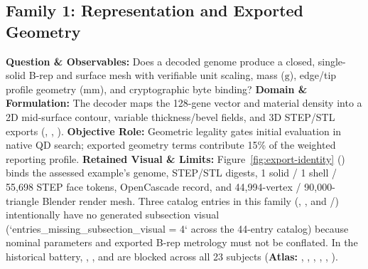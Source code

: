 \subsection{Family 1: Representation and Exported Geometry}
\label{subsec:family-geometry}
\textbf{Question \& Observables:} Does a decoded genome produce a closed, single-solid B-rep and surface mesh with verifiable unit scaling, mass ($\mathrm{g}$), edge/tip profile geometry ($\mathrm{mm}$), and cryptographic byte binding?
\textbf{Domain \& Formulation:} The decoder maps the 128-gene vector and material density into a 2D mid-surface contour, variable thickness/bevel fields, and 3D STEP/STL exports (, , ).
\textbf{Objective Role:} Geometric legality gates initial evaluation in native QD search; exported geometry terms contribute 15\% of the weighted reporting profile.
\textbf{Retained Visual \& Limits:} Figure~\ref{fig:export-identity} () binds the assessed example's genome, STEP/STL digests, 1 solid / 1 shell / 55,698 STEP face tokens, OpenCascade  record, and 44,994-vertex / 90,000-triangle Blender render mesh. Three catalog entries in this family (, , and /) intentionally have no generated subsection visual (`entries_missing_subsection_visual = 4` across the 44-entry catalog) because nominal parameters and exported B-rep metrology must not be conflated. In the historical battery, , , and  are blocked across all 23 subjects (\textbf{Atlas:} , , , , , ).

